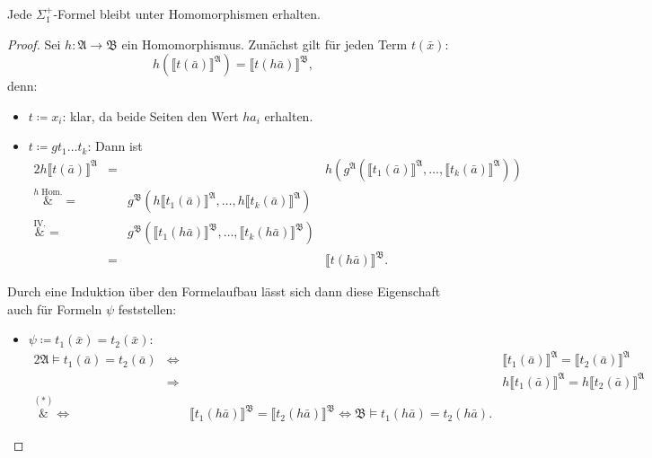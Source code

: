 \begin{lemma}
	Jede $\Sigma^+_1$-Formel bleibt unter Homomorphismen erhalten.
	\label{Sigma1UnterHom}
\end{lemma}
\begin{proof}
	Sei $h:\mathfrak{A}\to\mathfrak{B}$ ein Homomorphismus. Zunächst gilt für jeden Term $t(\bar{x})$:
	\[h(\llbracket t(\bar{a})\rrbracket^\mathfrak{A})=\llbracket t(h\bar{a})\rrbracket^\mathfrak{B}, \tag{$(\ast)$}\]
	denn:
	\begin{itemize}
		\item $t\coloneqq x_i$: klar, da beide Seiten den Wert $ha_i$ \glqq erhalten\grqq{}.
		\item $t\coloneqq gt_1\dots t_k$: Dann ist
		\begin{alignat*}{2}
			h\llbracket t(\bar{a})\rrbracket^\mathfrak{A} 
			&= &&h(g^\mathfrak{A}(\llbracket t_1(\bar{a})\rrbracket^\mathfrak{A},\dots,\llbracket t_k(\bar{a})\rrbracket^\mathfrak{A})) \\
			\overset{h \text{ Hom.}}&{=} &&g^\mathfrak{B}(h\llbracket t_1(\bar{a})\rrbracket^\mathfrak{A},\dots,h\llbracket t_k(\bar{a})\rrbracket^\mathfrak{A}) \\
			\overset{\text{IV.}}&{=} &&g^\mathfrak{B}(\llbracket t_1(h\bar{a})\rrbracket^\mathfrak{B},\dots,\llbracket t_k(h\bar{a})\rrbracket^\mathfrak{B}) \\
			&= &&\llbracket t(h\bar{a})\rrbracket^\mathfrak{B}.
		\end{alignat*}
	\end{itemize}
	Durch eine Induktion über den Formelaufbau lässt sich dann diese Eigenschaft auch für Formeln $\psi$ feststellen:
	\begin{itemize}
		\item $\psi\coloneqq t_1(\bar{x})=t_2(\bar{x})$:
		\begin{alignat*}{2}
			\mathfrak{A}\models t_1(\bar{a})=t_2(\bar{a})
			&\Longleftrightarrow &&\llbracket t_1(\bar{a})\rrbracket^\mathfrak{A} = \llbracket t_2(\bar{a})\rrbracket^\mathfrak{A} \\
			&\Longrightarrow &&h\llbracket t_1(\bar{a})\rrbracket^\mathfrak{A} = h\llbracket t_2(\bar{a})\rrbracket^\mathfrak{A} \tag{$\vartriangle$}\\
			\overset{(\ast)}&{\Longleftrightarrow} &&\llbracket t_1(h\bar{a})\rrbracket^\mathfrak{B} = \llbracket t_2(h\bar{a})\rrbracket^\mathfrak{B} \Leftrightarrow \mathfrak{B}\models t_1(h\bar{a})=t_2(h\bar{a}).
		\end{alignat*}
		

\end{itemize}
\end{proof}
